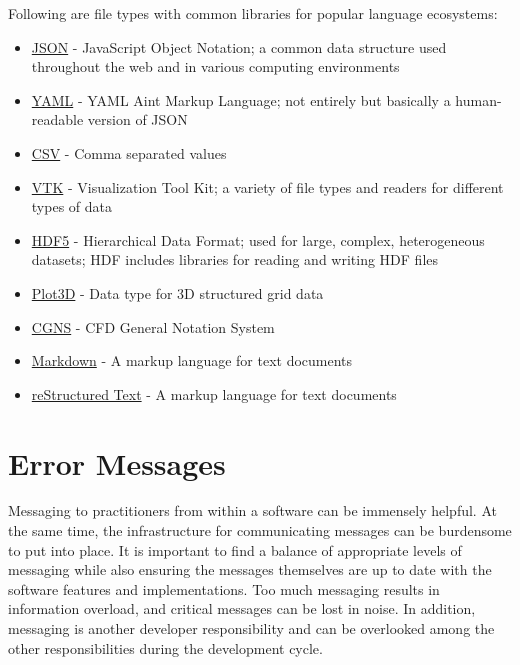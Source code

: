 \documentclass[]{nrel}
\begin{document}
Following are file types with common libraries for popular language ecosystems:
\begin{itemize}
\item \href{https://developer.mozilla.org/en-US/docs/Learn/JavaScript/Objects/JSON}{JSON} - JavaScript
    Object Notation; a common data structure used throughout the web and in various
    computing environments
\item \href{https://yaml.org}{YAML} - YAML Aint Markup Language; not entirely but basically a
    human-readable version of JSON
\item \href{https://en.wikipedia.org/wiki/Comma-separated_values}{CSV} - Comma separated values
\item \href{https://examples.vtk.org/site/VTKFileFormats/}{VTK} - Visualization Tool Kit; a variety of
    file types and readers for different types of data
\item \href{https://portal.hdfgroup.org/display/HDF5/HDF5}{HDF5} - Hierarchical Data Format; used for large,
    complex, heterogeneous datasets; HDF includes libraries for reading and writing HDF files
\item \href{https://github.com/nasa/Plot3D_utilities}{Plot3D} - Data type for 3D structured grid data
\item \href{https://cgns.github.io/WhatIsCGNS.html}{CGNS} - CFD General Notation System
\item \href{https://www.markdownguide.org/getting-started/}{Markdown} - A markup language for text documents
\item \href{https://docutils.sourceforge.io/rst.html}{reStructured Text} - A markup language for text
    documents
\end{itemize}

\section{Error Messages}
Messaging to practitioners from within a software can be immensely helpful.
At the same time, the infrastructure for communicating messages can be burdensome to put into place.
It is important to find a balance of appropriate levels of messaging while also ensuring
the messages themselves are up to date with the software features and implementations.
Too much messaging results in information overload, and critical messages can be lost in noise.
In addition, messaging is another developer responsibility and can be overlooked among the
other responsibilities during the development cycle.
\end{document}
